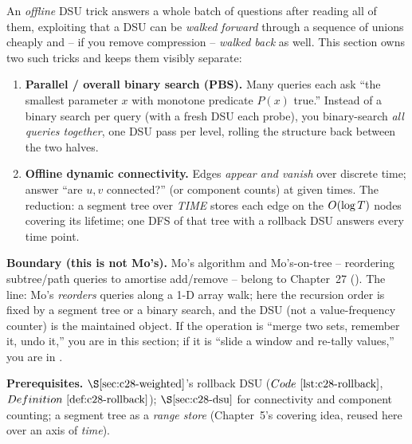 \begin{topicintro}
An \emph{offline} DSU trick answers a whole batch of questions after reading all
of them, exploiting that a DSU can be \emph{walked forward} through a sequence
of unions cheaply and -- if you remove compression -- \emph{walked back} as
well.  This section owns two such tricks and keeps them visibly separate:

\begin{enumerate}[nosep,leftmargin=1.6em]
  \item \textbf{Parallel / overall binary search (PBS).}  Many queries each ask
        ``the smallest parameter \(x\) with monotone predicate \(P(x)\) true.''
        Instead of a binary search per query (with a fresh DSU each probe),
        you binary-search \emph{all queries together}, one DSU pass per level,
        rolling the structure back between the two halves.
  \item \textbf{Offline dynamic connectivity.}  Edges \emph{appear and vanish}
        over discrete time; answer ``are \(u,v\) connected?'' (or component
        counts) at given times.  The reduction: a segment tree over \emph{TIME}
        stores each edge on the \(O(\log T)\) nodes covering its lifetime;
        one DFS of that tree with a rollback DSU answers every time point.
\end{enumerate}

\textbf{Boundary (this is not Mo's).}  Mo's algorithm and Mo's-on-tree --
reordering subtree/path queries to amortise add/remove -- belong to
Chapter~27 ().  The line: Mo's \emph{reorders} queries along a
1-D array walk; here the recursion order is fixed by a segment tree or a
binary search, and the DSU (not a value-frequency counter) is the maintained
object.  If the operation is ``merge two sets, remember it, undo it,'' you are
in this section; if it is ``slide a window and re-tally values,'' you are in
.

\textbf{Prerequisites.} \(\secref{c28-weighted}\)'s rollback DSU
(\(\coderef{c28-rollback}\), \(\defref{c28-rollback}\)); \(\secref{c28-dsu}\)
for connectivity and component counting; a segment tree as a \emph{range store}
(Chapter~5's covering idea, reused here over an axis of \emph{time}).
\end{topicintro}

